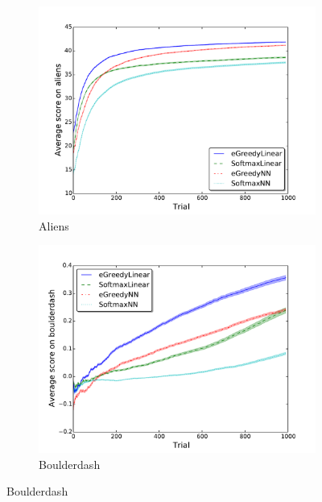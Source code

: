 \documentclass[conference]{IEEEtran}
\begin{document}
\begin{figure}[!t]
	\begin{center}
\begin{subfigure} {\lefig\textwidth}
	\includegraphics[width =\textwidth]{img/aliens_scores}
  \caption{Aliens}
\end{subfigure}\begin{subfigure} {\lefig\textwidth}
	\includegraphics[width = \textwidth]{img/boulderdash_scores}
  \caption{Boulderdash}
\end{subfigure}


\end{center}
\end{figure}
\end{document}
